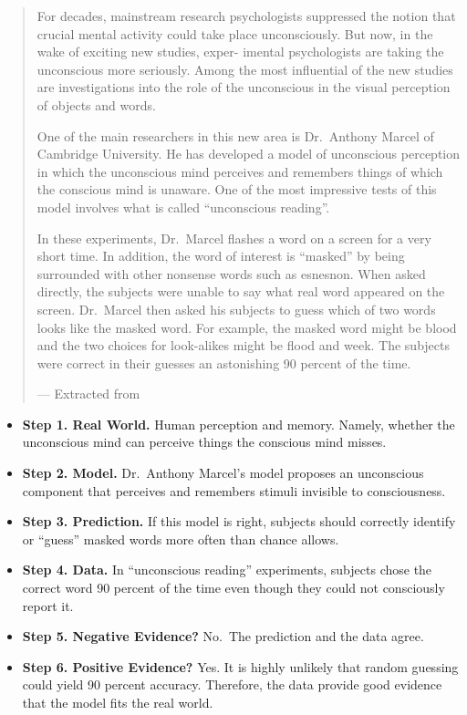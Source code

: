 \documentclass[
  12pt,
]{book}
\providecommand{\tightlist}{%
  \setlength{\itemsep}{0pt}\setlength{\parskip}{0pt}}
\begin{document}
\begin{quote}
For decades, mainstream research psychologists suppressed the notion that crucial mental
activity could take place unconsciously. But now, in the wake of exciting new studies, exper-
imental psychologists are taking the unconscious more seriously. Among the most influential
of the new studies are investigations into the role of the unconscious in the visual perception
of objects and words.

One of the main researchers in this new area is Dr.~Anthony Marcel of Cambridge
University. He has developed a model of unconscious perception in which the unconscious
mind perceives and remembers things of which the conscious mind is unaware. One of the
most impressive tests of this model involves what is called ``unconscious reading''.

In these experiments, Dr.~Marcel flashes a word on a screen for a very short time. In
addition, the word of interest is ``masked'' by being surrounded with other nonsense words
such as esnesnon. When asked directly, the subjects were unable to say what real word
appeared on the screen. Dr.~Marcel then asked his subjects to guess which of two words
looks like the masked word. For example, the masked word might be blood and the two
choices for look-alikes might be flood and week. The subjects were correct in their guesses
an astonishing 90 percent of the time.

--- Extracted from \citep{giere2006understanding}
\end{quote}

\begin{itemize}
\tightlist
\item
  \textbf{Step 1. Real World.} Human perception and memory. Namely, whether the unconscious mind can perceive things the conscious mind misses.
\item
  \textbf{Step 2. Model.} Dr.~Anthony Marcel's model proposes an unconscious component that perceives and remembers stimuli invisible to consciousness.
\item
  \textbf{Step 3. Prediction.} If this model is right, subjects should correctly identify or ``guess'' masked words more often than chance allows.
\item
  \textbf{Step 4. Data.} In ``unconscious reading'' experiments, subjects chose the correct word 90 percent of the time even though they could not consciously report it.
\item
  \textbf{Step 5. Negative Evidence?} No.~The prediction and the data agree.
\item
  \textbf{Step 6. Positive Evidence?} Yes. It is highly unlikely that random guessing could yield 90 percent accuracy. Therefore, the data provide good evidence that the model fits the real world.
\end{itemize}
\end{document}
